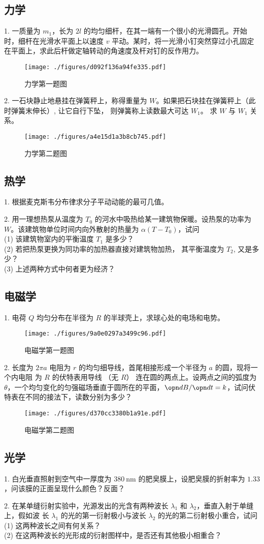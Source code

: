 \subsection{力学}
1. 一质量为 $m_{1}$，长为 $2l$ 的均匀细杆，在其一端有一个很小的光滑圆孔。开始时，细杆在光滑水平面上以速度 $v$ 平动。某时，将一光滑小钉突然穿过小孔固定在平面上，求此后杆做定轴转动的角速度及杆对钉的反作用力。
\begin{figure}[ht]
\centering
\texttt{[image: ./figures/d092f136a94fe335.pdf]}
\caption{力学第一题图} \label{fig_NJU14_1}
\end{figure}
2. 一石块静止地悬挂在弹簧秤上，称得重量为 $W$。如果把石块挂在弹簧秤上（此时弹簧末伸长）, 让它自行下坠， 则弹簧称上读数最大可达 $W_{1}$。 求 $W$ 与 $W_{1}$ 关系。
\begin{figure}[ht]
\centering
\texttt{[image: ./figures/a4e15d1a3b8cb745.pdf]}
\caption{力学第二题图} \label{fig_NJU14_2}
\end{figure}
\subsection{热学}
1. 根据麦克斯韦分布律求分子平动动能的最可几值。

2. 用一理想热泵从温度为 $T_{0}$ 的河水中吸热给某一建筑物保暖。设热泵的功率为 $W$。该建筑物单位时间内向外散射的热量为 $\alpha\left(T-T_{0}\right)$，试问\\
(1) 该建筑物室内的平衡温度 $T_{1}$ 是多少？\\
(2) 若把热泵更换为同功率的加热器直接对建筑物加热， 其平衡温度为 $T_{2}$, 又是多少？\\
(3) 上述两种方式中何者更为经济？\\
\subsection{电磁学}
1. 电荷 $Q$ 均匀分布在半径为 $R$ 的半球壳上，求球心处的电场和电势。
\begin{figure}[ht]
\centering
\texttt{[image: ./figures/9a0e0297a3499c96.pdf]}
\caption{电磁学第一题图} \label{fig_NJU14_4}
\end{figure}
2. 长度为 $2 \pi a$ 电阻为 $r$ 的均匀细导线，首尾相接形成一个半径为 $a$ 的圆，现将一个内电阻 为 $R$ 的伏特表用导线 （无 $R$） 连在圆的两点上。设两点之间的弧度为 $\theta$，一个均匀变化的匀强磁场垂直于圆所在的平面，$\opn dB/\opn dt =k$，试问伏特表在不同的接法下，读数分别为多少？
\begin{figure}[ht]
\centering
\texttt{[image: ./figures/d370cc3380b1a91e.pdf]}
\caption{电磁学第二题图} \label{fig_NJU14_3}
\end{figure}
\subsection{光学}
1. 白光垂直照射到空气中一厚度为 $380 \mathrm{~nm}$ 的肥㚖膜上，设肥㚖膜的折射率为 $1.33$，问该膜的正面呈现什么颜色？反面？

2. 在某单缝衍射实验中，光源发出的光含有两种波长 $\lambda_{1}$ 和 $\lambda_{2}$，垂直入射于单缝上，假如波 长 $\lambda_{1}$ 的光的第一衍射极小与波长 $\lambda_{2}$ 的光的第二衍射极小重合，试问\\
(1) 这两种波长之间有何关系？\\
(2) 在这两种波长的光形成的衍射图样中，是否还有其他极小相重合？